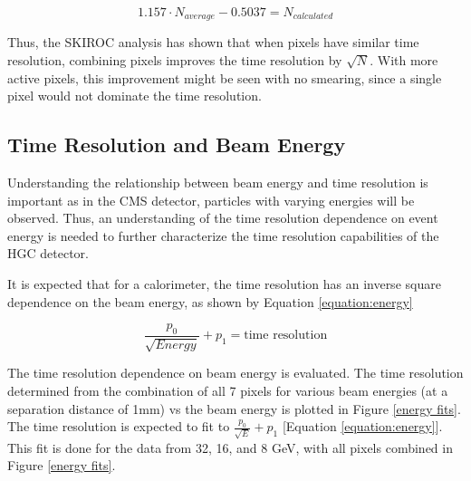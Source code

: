 \documentclass[twocolumn,aps,prd,reprint]{revtex4-1}
\begin{document}
\begin{equation}
1.157 \cdot N_{average} - 0.5037 = N_{calculated}
\end{equation}

Thus, the SKIROC analysis has shown that when pixels have similar time resolution, combining pixels improves the time resolution by $\sqrt{N}$. With more active pixels, this improvement might be seen with no smearing, since a single pixel would not dominate the time resolution.

\subsection{Time Resolution and Beam Energy}

Understanding the relationship between beam energy and time resolution is important as in the CMS detector, particles with varying energies will be observed. Thus, an understanding of the time resolution dependence on event energy is needed to further characterize the time resolution capabilities of the HGC detector.

It is expected that for a calorimeter, the time resolution has an inverse square dependence on the beam energy, as shown by Equation \ref{equation:energy}

\begin{equation}
\frac{p_0}{\sqrt{Energy}} + p_1 = \text{time resolution}
\label{equation:energy}
\end{equation}

The time resolution dependence on beam energy is evaluated. The time resolution determined from the combination of all 7 pixels for various beam energies (at a separation distance of 1mm) vs the beam energy is plotted in Figure \ref{energy fits}. The time resolution is expected to fit to $\frac{p_0}{\sqrt{E}} + p_1$ [Equation \ref{equation:energy}]. This fit is done for the data from 32, 16, and 8 GeV, with all pixels combined in Figure \ref{energy fits}.
\end{document}
